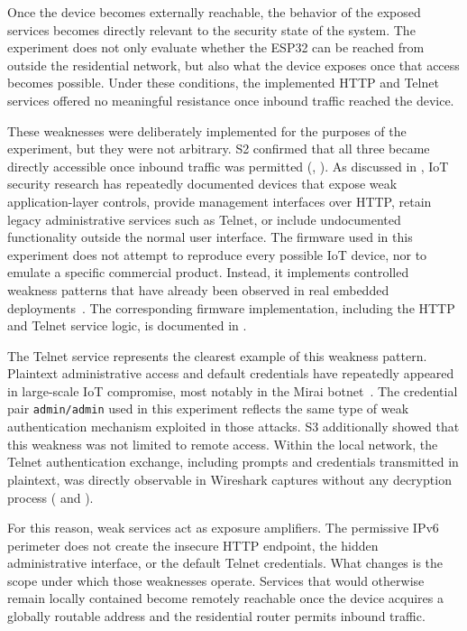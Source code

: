 Once the device becomes externally reachable, the behavior of the exposed services becomes directly relevant to the security state of the system. The experiment does not only evaluate whether the ESP32 can be reached from outside the residential network, but also what the device exposes once that access becomes possible. Under these conditions, the implemented HTTP and Telnet services offered no meaningful resistance once inbound traffic reached the device.

These weaknesses were deliberately implemented for the purposes of the experiment, but they were not arbitrary. S2 confirmed that all three became directly accessible once inbound traffic was permitted (, ). As discussed in , IoT security research has repeatedly documented devices that expose weak application-layer controls, provide management interfaces over HTTP, retain legacy administrative services such as Telnet, or include undocumented functionality outside the normal user interface. The firmware used in this experiment does not attempt to reproduce every possible IoT device, nor to emulate a specific commercial product. Instead, it implements controlled weakness patterns that have already been observed in real embedded deployments~\cite{alrawi2019sok,costin2014firmware,liu2025eagleye}. The corresponding firmware implementation, including the HTTP and Telnet service logic, is documented in .

The Telnet service represents the clearest example of this weakness pattern. Plaintext administrative access and default credentials have repeatedly appeared in large-scale IoT compromise, most notably in the Mirai botnet~\cite{antonakakis2017mirai}. The credential pair \texttt{admin/admin} used in this experiment reflects the same type of weak authentication mechanism exploited in those attacks. S3 additionally showed that this weakness was not limited to remote access. Within the local network, the Telnet authentication exchange, including prompts and credentials transmitted in plaintext, was directly observable in Wireshark captures without any decryption process ( and ).

For this reason, weak services act as exposure amplifiers. The permissive IPv6 perimeter does not create the insecure HTTP endpoint, the hidden administrative interface, or the default Telnet credentials. What changes is the scope under which those weaknesses operate. Services that would otherwise remain locally contained become remotely reachable once the device acquires a globally routable address and the residential router permits inbound traffic.

